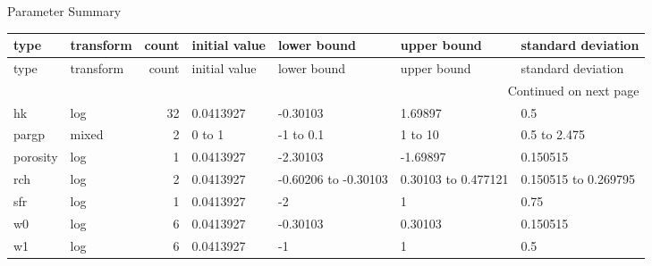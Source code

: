 \documentclass{article}
\begin{document}
\begin{center}
Parameter Summary
\end{center}
\begin{center}
\begin{landscape}
\begin{longtable}{llrllll}
type & transform & count & initial value & lower bound & upper bound & standard deviation \\
\endfirsthead
type & transform & count & initial value & lower bound & upper bound & standard deviation \\
\endhead
\multicolumn{7}{r}{Continued on next page} \\
\endfoot
\endlastfoot
hk & log & 32 & 0.0413927 & -0.30103 & 1.69897 &   0.5 \\
pargp & mixed & 2 &     0 to     1 &    -1 to   0.1 &     1 to    10 &   0.5 to 2.475 \\
porosity & log & 1 & 0.0413927 & -2.30103 & -1.69897 & 0.150515 \\
rch & log & 2 & 0.0413927 & -0.60206 to -0.30103 & 0.30103 to 0.477121 & 0.150515 to 0.269795 \\
sfr & log & 1 & 0.0413927 &    -2 &     1 &  0.75 \\
w0 & log & 6 & 0.0413927 & -0.30103 & 0.30103 & 0.150515 \\
w1 & log & 6 & 0.0413927 &    -1 &     1 &   0.5 \\
\end{longtable}
\end{landscape}
\end{center}
\end{document}
